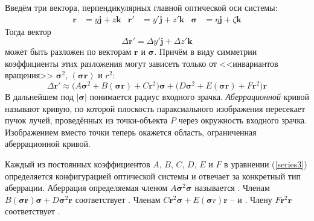 	Введём три вектора, перпендикулярных главной оптической оси системы:
	\begin{align*}
	\mathbf{r} &= y\mathbf{j} + z\mathbf{k} & \mathbf{r}' &= y'\mathbf{j} + z'\mathbf{k} & \bm{\sigma} &= \eta\mathbf{j} + \zeta\mathbf{k}
	\end{align*}
	Тогда вектор 
	\begin{equation*}
	\Delta \mathbf{r}' = \Delta y'\mathbf{j} + \Delta z'\mathbf{k}
	\end{equation*}
	может быть разложен по векторам $\mathbf{r}$ и $\bm{\sigma}$.
 	Причём в виду симметрии коэффициенты этих разложения могут зависеть только от <<инвариантов вращения>> $\bm{\sigma}^{2}$, $(\bm{\sigma}\mathbf{r})$ и $r^{2}$:
 	\begin{equation}
 	\label{series3}
 	\Delta \mathbf{r}' \approx \Big(A\bm{\sigma}^{2} + B(\bm{\sigma}\mathbf{r}) + C\mathbf{r}^{2}\Big)\bm{\sigma} + \Big(D\bm{\sigma}^{2} + E(\bm{\sigma}\mathbf{r}) + F\mathbf{r}^{2}\Big)\mathbf{r}
 	\end{equation}
 	В дальнейшем под $|\bm{\sigma}|$ понимается радиус входного зрачка. \textit{Аберрационной} кривой называют кривую, по которой плоскость параксиального изображения пересекает пучок лучей, проведённых из точки-объекта $P$ через окружность входного зрачка. Изображением вместо точки теперь окажется область, ограниченная аберрационной кривой.
 	
 	Каждый из постоянных коэффициентов $A$, $B$, $C$, $D$, $E$ и $F$ в уравнении (\ref{series3}) определяется конфигурацией оптической системы и отвечает за конкретный тип аберрации. Аберрация определяемая членом $A\bm{\sigma}^{2}\bm{\sigma}$ называется \color{blue}{сферической}\normalcolor. Членам $B(\bm{\sigma}\mathbf{r})\bm{\sigma} + D\bm{\sigma}^{2}\mathbf{r}$ соответствует \color{blue}{кома}\normalcolor. Членам $C\mathbf{r}^{2}\bm{\sigma} + E(\bm{\sigma} r)\mathbf{r}$ -- \color{blue}{астигматизм косых лучей} \normalcolor и \color{blue}{искривление плоскости изображения}\normalcolor. Члену $F\mathbf{r}^{2}\mathbf{r}$  соответствует \color{blue}{дисторсия}\normalcolor.
